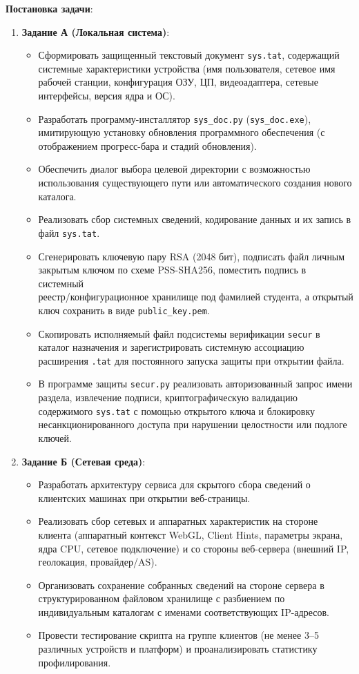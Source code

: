 \documentclass[a4paper]{article}
\begin{document}
\textbf{Постановка задачи}:
\begin{enumerate}
    \item \textbf{Задание А (Локальная система)}:
          \begin{itemize}
              \item Сформировать защищенный текстовый документ \texttt{sys.tat}, содержащий системные характеристики устройства (имя пользователя, сетевое имя рабочей станции, конфигурация ОЗУ, ЦП, видеоадаптера, сетевые интерфейсы, версия ядра и ОС).
              \item Разработать программу-инсталлятор \texttt{sys\_doc.py} (\texttt{sys\_doc.exe}), имитирующую установку обновления программного обеспечения (с отображением прогресс-бара и стадий обновления).
              \item Обеспечить диалог выбора целевой директории с возможностью использования существующего пути или автоматического создания нового каталога.
              \item Реализовать сбор системных сведений, кодирование данных и их запись в файл \texttt{sys.tat}.
              \item Сгенерировать ключевую пару RSA (2048 бит), подписать файл личным закрытым ключом по схеме PSS-SHA256, поместить подпись в системный \\ реестр/конфигурационное хранилище под фамилией студента, а открытый ключ сохранить в виде \texttt{public\_key.pem}.
              \item Скопировать исполняемый файл подсистемы верификации \texttt{secur} в каталог назначения и зарегистрировать системную ассоциацию расширения \texttt{.tat} для постоянного запуска защиты при открытии файла.
              \item В программе защиты \texttt{secur.py} реализовать авторизованный запрос имени раздела, извлечение подписи, криптографическую валидацию содержимого \texttt{sys.tat} с помощью открытого ключа и блокировку несанкционированного доступа при нарушении целостности или подлоге ключей.
          \end{itemize}
    \item \textbf{Задание Б (Сетевая среда)}:
          \begin{itemize}
              \item Разработать архитектуру сервиса для скрытого сбора сведений о клиентских машинах при открытии веб-страницы.
              \item Реализовать сбор сетевых и аппаратных характеристик на стороне клиента (аппаратный контекст WebGL, Client Hints, параметры экрана, ядра CPU, сетевое подключение) и со стороны веб-сервера (внешний IP, геолокация, провайдер/AS).
              \item Организовать сохранение собранных сведений на стороне сервера в структурированном файловом хранилище с разбиением по индивидуальным каталогам с именами соответствующих IP-адресов.
              \item Провести тестирование скрипта на группе клиентов (не менее 3--5 различных устройств и платформ) и проанализировать статистику профилирования.
          \end{itemize}
\end{enumerate}
\end{document}
